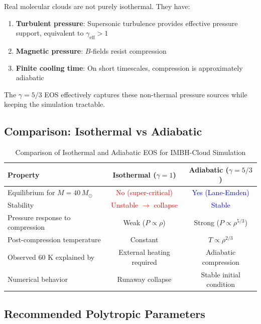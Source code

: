 \documentclass[11pt,a4paper]{article}
\newcommand{\Msun}{M_\odot}
\begin{document}
Real molecular clouds are not purely isothermal. They have:
\begin{enumerate}
    \item \textbf{Turbulent pressure}: Supersonic turbulence provides effective pressure support,
          equivalent to $\gamma_\mathrm{eff} > 1$
    \item \textbf{Magnetic pressure}: $B$-fields resist compression
    \item \textbf{Finite cooling time}: On short timescales, compression is approximately adiabatic
\end{enumerate}

The $\gamma = 5/3$ EOS effectively captures these non-thermal pressure sources
while keeping the simulation tractable.

\subsection{Comparison: Isothermal vs Adiabatic}

\begin{table}[h]
\centering
\caption{Comparison of Isothermal and Adiabatic EOS for IMBH-Cloud Simulation}
\begin{tabular}{lcc}
\toprule
\textbf{Property} & \textbf{Isothermal ($\gamma = 1$)} & \textbf{Adiabatic ($\gamma = 5/3$)} \\
\midrule
Equilibrium for $M = 40\,\Msun$ & \textcolor{red}{No (super-critical)} & \textcolor{blue}{Yes (Lane-Emden)} \\
Stability & \textcolor{red}{Unstable $\to$ collapse} & \textcolor{blue}{Stable} \\
Pressure response to compression & Weak ($P \propto \rho$) & Strong ($P \propto \rho^{5/3}$) \\
Post-compression temperature & Constant & $T \propto \rho^{2/3}$ \\
Observed 60 K explained by & External heating required & Adiabatic compression \\
Numerical behavior & Runaway collapse & Stable initial condition \\
\bottomrule
\end{tabular}
\end{table}

\subsection{Recommended Polytropic Parameters}
\end{document}
